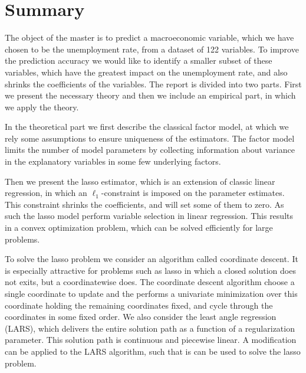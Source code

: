 \chapter{Summary}
%
The object of the master is to predict a macroeconomic variable, which we have chosen to be the unemployment rate, from a dataset of 122 variables.
To improve the prediction accuracy we would like to identify a smaller subset of these variables, which have the greatest impact on the unemployment rate, and also shrinks the coefficients of the variables.
The report is divided into two parts. 
First we present the necessary theory and then we include an empirical part, in which we apply the theory.

In the theoretical part we first describe the classical factor model, at which we rely some assumptions to ensure uniqueness of the estimators.
The factor model limits the number of model parameters by collecting information about variance in the explanatory variables in some few underlying factors.

Then we present the lasso estimator, which is an extension of classic linear regression, in which an \(\ell_1\)-constraint is imposed on the parameter estimates.
This constraint shrinks the coefficients, and will set some of them to zero.
As such the lasso model perform variable selection in linear regression.
This results in a convex optimization problem, which can be solved efficiently for large problems.

To solve the lasso problem we consider an algorithm called coordinate descent.
It is especially attractive for problems such as lasso in which a closed solution does not exits, but a coordinatewise does.
The coordinate descent algorithm choose a single coordinate to update and the performs a univariate minimization over this coordinate holding the remaining coordinates fixed, and cycle through the coordinates in some fixed order.
We also consider the least angle regression (LARS), which delivers the entire solution path as a function of a regularization parameter.
This solution path is continuous and piecewise linear.
A modification can be applied to the LARS algorithm, such that is can be used to solve the lasso problem.

